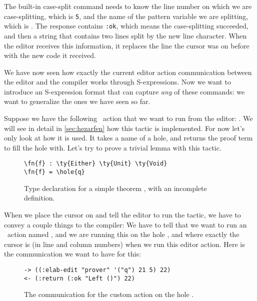The built-in case-split command needs to know the line number on which we are
case-splitting, which is \texttt{5}, and the name of the pattern variable we are
splitting, which is .  The response contains \texttt{:ok}, which means
the case-splitting succeeded, and then a string that contains two lines split
by the new line character. When the editor receives this information, it
replaces the line the cursor was on before with the new code it received.

We have now seen how exactly the current editor action communication between
the editor and the compiler works through S-expressions.
Now we want to introduce an S-expression format that can capture \emph{any} of
these commands: we want to generalize the ones we have seen so far.

Suppose we have the following \Elab\ action that we want to run from the editor:
.
We will see in detail in \autoref{sec:hezarfen} how this tactic is
implemented. For now let's only look at how it is used. It takes a name of a
hole, and returns the proof term to fill the hole with.
Let's try to prove a trivial lemma with this tactic.

\begin{figure}[H]
\caption{Type declaration for a simple theorem , with an incomplete definition.}
\begin{Verbatim}[framesep=2mm, label=\footnotesize{\normalfont{Idris}}, labelposition=topline]
\fn{f} : \ty{Either} \ty{Unit} \ty{Void}
\fn{f} = \hole{q}
\end{Verbatim}
\end{figure}

When we place the cursor on  and tell the editor to run the 
tactic, we have to convey a couple things to the compiler: We have to tell that
we want to run an \Elab\ action named , and we are running this on
the hole , and where exactly the cursor is (in line and column numbers)
when we run this editor action. Here is the communication we want to have for this:

\begin{figure}[H]
\caption{The communication for the custom  action on the hole .}
\begin{Verbatim}[framesep=2mm, label=\footnotesize{\normalfont{S-expression}}, labelposition=topline]
-> ((:elab-edit "prover" '("q") 21 5) 22)
<- (:return (:ok "Left ()") 22)
\end{Verbatim}
\end{figure}

